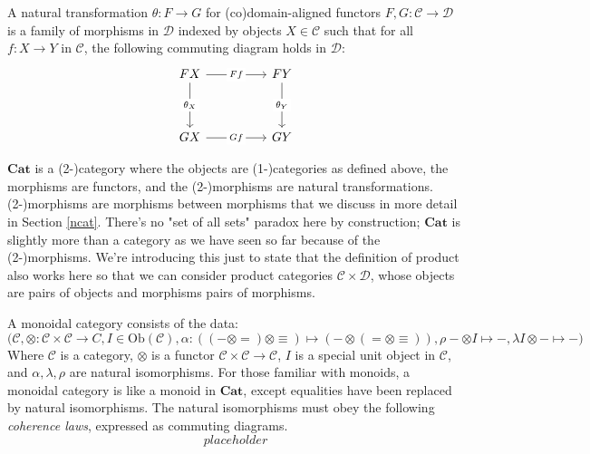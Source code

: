 \begin{defn}
A natural transformation $\theta: F \rightarrow G$ for (co)domain-aligned functors $F,G: \mathcal{C} \rightarrow \mathcal{D}$ is a family of morphisms in $\mathcal{D}$ indexed by objects $X \in \mathcal{C}$ such that for all $f: X \rightarrow Y$ in $\mathcal{C}$, the following commuting diagram holds in $\mathcal{D}$:
\[\begin{tikzcd}
	FX && FY \\
	\\
	GX && GY
	\arrow["{\theta_X}"{description}, from=1-1, to=3-1]
	\arrow["Ff"{description}, from=1-1, to=1-3]
	\arrow["{\theta_Y}"{description}, from=1-3, to=3-3]
	\arrow["Gf"{description}, from=3-1, to=3-3]
\end{tikzcd}\]
\end{defn}

\begin{defn}
$\mathbf{Cat}$ is a (2-)category where the objects are (1-)categories as defined above, the morphisms are functors, and the (2-)morphisms are natural transformations. (2-)morphisms are morphisms between morphisms that we discuss in more detail in Section \ref{ncat}. There's no "set of all sets" paradox here by construction; $\mathbf{Cat}$ is slightly more than a category as we have seen so far because of the (2-)morphisms. We're introducing this just to state that the definition of product also works here so that we can consider product categories $\mathcal{C} \times \mathcal{D}$, whose objects are pairs of objects and morphisms pairs of morphisms.
\end{defn}

\begin{defn}
A monoidal category consists of the data: $\big(\mathcal{C},\otimes: \mathcal{C} \times \mathcal{C} \rightarrow C, I \in \text{Ob}(\mathcal{C}), \alpha: ((- \otimes =) \otimes \equiv) \mapsto (- \otimes (= \otimes \equiv)), \rho - \otimes I \mapsto -, \lambda I \otimes - \mapsto -\big)$
Where $\mathcal{C}$ is a category, $\otimes$ is a functor $\mathcal{C} \times \mathcal{C} \rightarrow \mathcal{C}$, $I$ is a special unit object in $\mathcal{C}$, and $\alpha,\lambda,\rho$ are natural isomorphisms. For those familiar with monoids, a monoidal category is like a monoid in $\mathbf{Cat}$, except equalities have been replaced by natural isomorphisms. The natural isomorphisms must obey the following \emph{coherence laws}, expressed as commuting diagrams.
\[placeholder\]
\end{defn}

